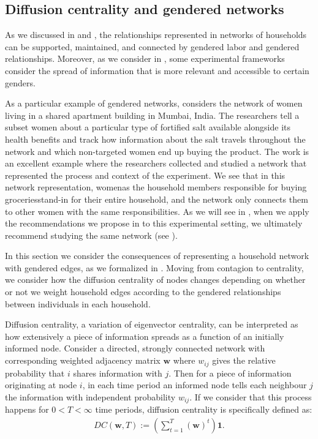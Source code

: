 \subsection{Diffusion centrality and gendered networks}\label{subsec:gender}
As we discussed in  and , the relationships represented in networks of households can be supported, maintained, and connected by gendered labor and gendered relationships. Moreover, as we consider in , some experimental frameworks consider the spread of information that is more relevant and accessible to certain genders. 

As a particular example of gendered networks, \cite{alexander2022algorithms} considers the network of women living in a shared apartment building in Mumbai, India. The researchers tell a subset women about a particular type of fortified salt available alongside its health benefits and track how information about the salt travels throughout the network and which non-targeted women end up buying the product. The work is an excellent example where the researchers collected and studied a network that represented the process and context of the experiment. We see that in this network representation, women\textemdash as the household members responsible for buying groceries\textemdash stand-in for their entire household, and the network only connects them to other women with the same responsibilities. As we will see in , when we apply the recommendations we propose in  to this experimental setting, we ultimately recommend studying the same network (see ). 

In this section we consider the consequences of representing a household network with gendered edges, as we formalized in . Moving from contagion to centrality, we consider how the diffusion centrality \citep{banerjee2013, banerjee2019} of nodes changes depending on whether or not we weight household edges according to the gendered relationships between individuals in each household. 

Diffusion centrality, a variation of eigenvector centrality, can be interpreted as how extensively a piece of information spreads as a function of an initially informed node. Consider a directed, strongly connected network with corresponding weighted adjacency matrix $\boldsymbol{w}$ where $w_{ij}$ gives the relative probability that $i$ shares information with $j$. Then for a piece of information originating at node $i$, in each time period an informed node tells each neighbour $j$ the information with independent probability $w_{ij}$. If we consider that this process happens for $0 < T < \infty $ time periods, diffusion centrality is specifically defined as:
\begin{align}
    DC(\boldsymbol{w}, T):= \left(\sum_{t=1}^T (\boldsymbol{w})^t \right) \boldsymbol{1}.
\end{align}

